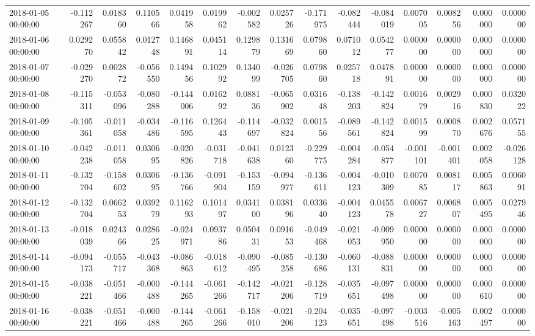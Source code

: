 \begin{tabular}{lrrrrrrrrrrrrrr}
2018-01-05 00:00:00 & -0.112267 & 0.018360 & 0.110566 & 0.041958 & 0.019962 & -0.002582 & 0.025726 & -0.171975 & -0.082444 & -0.084019 & 0.007005 & 0.008256 & 0.000000 & 0.000000 \\
2018-01-06 00:00:00 & 0.029270 & 0.055842 & 0.012748 & 0.146891 & 0.045114 & 0.129879 & 0.131669 & 0.079860 & 0.071012 & 0.054277 & 0.000000 & 0.000000 & 0.000000 & 0.000000 \\
2018-01-07 00:00:00 & -0.029270 & 0.002872 & -0.056550 & 0.149456 & 0.102992 & 0.134099 & -0.026705 & 0.079860 & 0.025718 & 0.047891 & 0.000000 & 0.000000 & 0.000000 & 0.000000 \\
2018-01-08 00:00:00 & -0.115311 & -0.053096 & -0.080288 & -0.144006 & 0.016292 & 0.088136 & -0.065902 & 0.031648 & -0.138203 & -0.142824 & 0.001679 & 0.002916 & 0.000830 & 0.032022 \\
2018-01-09 00:00:00 & -0.105361 & -0.011058 & -0.034486 & -0.116595 & 0.126443 & -0.114697 & -0.032824 & 0.001556 & -0.089561 & -0.142824 & 0.001599 & 0.000870 & 0.002676 & 0.057155 \\
2018-01-10 00:00:00 & -0.042238 & -0.011058 & 0.030695 & -0.020826 & -0.031718 & -0.041638 & 0.012360 & -0.229775 & -0.004284 & -0.054877 & -0.001101 & -0.001401 & 0.002058 & -0.026128 \\
2018-01-11 00:00:00 & -0.132704 & -0.158602 & 0.030695 & -0.136766 & -0.091904 & -0.153159 & -0.094977 & -0.136611 & -0.004123 & -0.010309 & 0.007085 & 0.008117 & 0.005863 & 0.006091 \\
2018-01-12 00:00:00 & -0.132704 & 0.066253 & 0.039279 & 0.116293 & 0.101497 & 0.034100 & 0.038196 & 0.033640 & -0.004123 & 0.045578 & 0.006727 & 0.006807 & 0.005495 & 0.027946 \\
2018-01-13 00:00:00 & -0.018039 & 0.024366 & 0.028625 & -0.024971 & 0.093786 & 0.050431 & 0.091653 & -0.049468 & -0.021053 & -0.009950 & 0.000000 & 0.000000 & 0.000000 & 0.000000 \\
2018-01-14 00:00:00 & -0.094173 & -0.055717 & -0.043368 & -0.086863 & -0.018612 & -0.090495 & -0.085258 & -0.130686 & -0.060131 & -0.088831 & 0.000000 & 0.000000 & 0.000000 & 0.000000 \\
2018-01-15 00:00:00 & -0.038221 & -0.051466 & -0.000488 & -0.144265 & -0.061266 & -0.142717 & -0.021206 & -0.128719 & -0.035651 & -0.097498 & 0.000000 & 0.000000 & 0.000610 & 0.000000 \\
2018-01-16 00:00:00 & -0.038221 & -0.051466 & -0.000488 & -0.144265 & -0.061266 & -0.158010 & -0.021206 & -0.204123 & -0.035651 & -0.097498 & -0.003516 & -0.005163 & 0.002497 & 0.000000 \\

\end{tabular}
